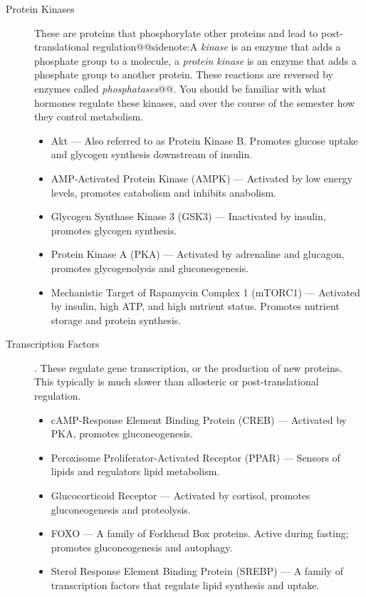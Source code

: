 \documentclass{tufte-handout}
\makeatletter
\def\sidenote#1{@@sidenote:#1@@}
\makeatother
\begin{document}
\begin{description}
	\item [Protein Kinases] These are proteins that phosphorylate other proteins and lead to post-translational regulation\sidenote{A \emph{kinase} is an enzyme that adds a phosphate group to a molecule, a \emph{protein kinase} is an enzyme that adds a phosphate group to another protein.  These reactions are reversed by enzymes called \emph{phosphatases}}.  You should be familiar with what hormones regulate these kinases, and over the course of the semester how they control metabolism.
	\begin{itemize}
		\item Akt --- Also referred to as Protein Kinase B.  Promotes glucose uptake and glycogen synthesis downstream of insulin.
		\item AMP-Activated Protein Kinase (AMPK) --- Activated by low energy levels, promotes catabolism and inhibits anabolism.
		\item Glycogen Synthase Kinase 3 (GSK3) --- Inactivated by insulin, promotes glycogen synthesis.
		\item Protein Kinase A (PKA) --- Activated by adrenaline and glucagon, promotes glycogenolysis and gluconeogenesis.
		\item Mechanistic Target of Rapamycin Complex 1 (mTORC1) --- Activated by insulin, high ATP, and high nutrient status.  Promotes nutrient storage and protein synthesis.
	\end{itemize}
	\item [Transcription Factors].  These regulate gene transcription, or the production of new proteins.  This typically is much slower than allosteric or post-translational regulation.
		\begin{itemize} 
			\item cAMP-Response Element Binding Protein (CREB) --- Activated by PKA, promotes gluconeogenesis.
			\item Peroxisome Proliferator-Activated Receptor (PPAR) --- Sensors of lipids and regulators lipid metabolism.
			\item Glucocorticoid Receptor --- Activated by cortisol, promotes gluconeogenesis and proteolysis.
			\item FOXO --- A family of Forkhead Box proteins.  Active during fasting; promotes gluconeogenesis and autophagy.
			\item Sterol Response Element Binding Protein (SREBP) --- A family of transcription factors that regulate lipid synthesis and uptake.
		\end{itemize}
\end{description}
\end{document}
